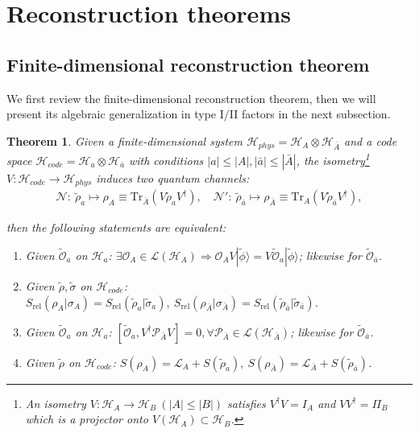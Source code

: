 \documentclass[a4paper,11pt]{article}
\newtheorem{thm}{Theorem}[section]
\newcommand{\abs}[1]{\left| #1 \right|} %
\renewcommand{\=}[1]{\stackrel{#1}{=}} %
\def\N{\mathcal{N}}
\def\O{\mathcal{O}}
\def\P{\mathcal{P}}
\def\H{\mathcal{H}}
\def\Tr{\text{Tr}}
\def\Srel{S_{\text{rel}}}
\begin{document}
\section{Reconstruction theorems}\label{sec:rec}

\subsection{Finite-dimensional reconstruction theorem}

We first review the finite-dimensional reconstruction theorem, then we will present its algebraic generalization in type I/II factors in the next subsection.

\begin{thm}
	Given a finite-dimensional system $\H_{phys}=\H_{A}\otimes\H_{\bar{A}}$ and a code space $\H_{code}=\H_{a}\otimes\H_{\bar{a}}$ with conditions $\abs{a}\leq\abs{A},\abs{\bar{a}}\leq\abs{\bar{A}}$, the isometry\footnote{An isometry $V: \H_A\rightarrow \H_B~(\abs{A}\leq \abs{B})$ satisfies $V^\dagger V=I_A$ and $VV^\dagger=\Pi_{B}$ which is a projector onto $V(\H_A)\subset\H_B$.} $V: \H_{code}\rightarrow \H_{phys}$ induces two quantum channels:
	\begin{align*}
		\N: ~\tilde{\rho}_a\mapsto \rho_A\equiv\Tr_{\bar{A}}\left(V\tilde{\rho}_aV^\dagger\right),\quad \N': ~\tilde{\rho}_{\bar{a}}\mapsto \rho_{\bar{A}}\equiv\Tr_{A}\left(V\tilde{\rho}_{\bar{a}}V^\dagger\right),
	\end{align*}
	
	then the following statements are equivalent:
	
	\begin{enumerate}
		
		\item Given $\widetilde{\O}_a$ on $\H_a$: $\exists \O_A\in\mathcal{L}(\H_A)\Rightarrow \O_AV|\tilde{\phi}\rangle=V\widetilde{\O}_a|\tilde{\phi}\rangle$; likewise for $\widetilde{\O}_{\bar{a}}$.
		
		\item Given $\tilde{\rho},\tilde{\sigma}$ on $\H_{code}$: $\Srel(\rho_A|\sigma_A)=\Srel(\tilde{\rho}_a|\tilde{\sigma}_a),~\Srel(\rho_{\bar{A}}|\sigma_{\bar{A}})=\Srel(\tilde{\rho}_{\bar{a}}|\tilde{\sigma}_{\bar{a}})$.
		
		\item 
		
		Given $\widetilde{\O}_{a}$ on $\H_a$: $[\widetilde{\O}_{a},V^\dagger \P _{\bar{A}}V]=0,\forall \P _{\bar{A}}\in\mathcal{L}(\H_{\bar{A}})$; likewise for $\widetilde{\O}_{\bar{a}}$.
		
		\item Given $\tilde{\rho}$ on $\H_{code}$: $S(\rho_A)=\mathcal{L}_A+S(\tilde{\rho}_a),~S(\rho_{\bar{A}})=\mathcal{L}_{\bar{A}}+S(\tilde{\rho}_{\bar{a}})$.
		
		
		
		
		
		
	\end{enumerate}
	
\end{thm}
\end{document}
